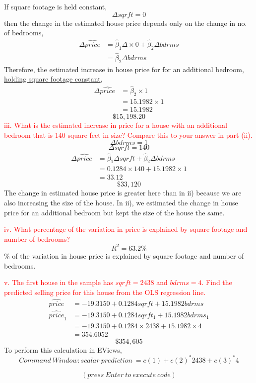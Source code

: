 \documentclass[12pt]{report}
\begin{document}
\noindent If square footage is held constant,
$$\Delta sqrft = 0$$
\noindent then the change in the estimated house price depends only on the change in no. of bedrooms,
\begin{align*}
	\Delta\widehat{price} &= \hat{\beta}_1\Delta \times 0 + \hat{\beta}_2\Delta bdrms \\
	&= \hat{\beta}_2\Delta bdrms
\end{align*}
\noindent Therefore, the estimated increase in house price for for an additional bedroom, \uline{holding square footage constant},
\begin{align*}
\Delta\widehat{price} &= \hat{\beta}_2 \times 1 \\
&= 15.1982 \times 1 \\
&= 15.1982
\end{align*}
$$\$15,198.20$$
\noindent \textcolor{red}
{
	iii. What is the estimated increase in price for a house with an additional bedroom that is 140 square feet in size? Compare this to your answer in part (ii).
}
$$\Delta bdrms = 1$$
$$\Delta sqrft = 140$$
\begin{align*}
\Delta\widehat{price} &= \hat{\beta}_1\Delta sqrft + \hat{\beta}_2\Delta bdrms \\
&= 0.1284 \times 140+15.1982 \times 1 \\
&= 33.12
\end{align*}
$$\$33,120$$
\noindent The change in estimated house price is greater here than in ii) because we are also increasing the size of the house. In ii), we estimated the change in house price for an additional bedroom but kept the size of the house the same.

\noindent \textcolor{red}
{
	iv. What percentage of the variation in price is explained by square footage and number of bedrooms?
}
$$R^2 = 63.2\%$$
\% of the variation in house price is explained by square footage and number of bedrooms.

\noindent \textcolor{red}
{
	v. The first house in the sample has $sqrft=2438$ and $bdrms=4$. Find the predicted selling price for this house from the OLS regression line.
}
\begin{align*}
\widehat{price} &= -19.3150 + 0.1284sqrft + 15.1982bdrms \\
\widehat{price}_1 &= -19.3150 + 0.1284sqrft_1 + 15.1982bdrms_1 \\
&= -19.3150+0.1284 \times 2438+15.1982 \times 4 \\
&= 354.6052
\end{align*}
$$\$354,605$$
\noindent To perform this calculation in EViews,
$$Command\ Window: scalar\ prediction\ = c(1) + c(2)^{*}2438 + c(3)^{*}4$$
\begin{figure}[H]
	\centering
\end{figure}
\vspace{-\baselineskip}
$$(press\ Enter\ to\ execute\ code)$$
\begin{figure}[H]
	\centering
\end{figure}
\vspace{-\baselineskip}
\begin{figure}[H]
	\centering
\end{figure}
\end{document}
